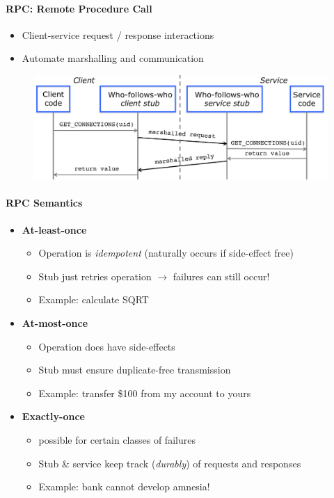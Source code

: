 \paragraph{RPC: Remote Procedure Call}
\begin{itemize}
\item Client-service request / response interactions
\item Automate marshalling and communication
\end{itemize}

\begin{figure}[h]
\begin{minipage}{1.0\linewidth}
  \begin{center}
    \includegraphics[scale=0.8]{graphics/rpc}
  \end{center}
  \end{minipage}
\end{figure}

\paragraph{RPC Semantics}
\begin{itemize}
\item \textbf{At-least-once}
  \begin{itemize}
  \item Operation is \textit{idempotent}
    (naturally occurs if side-effect free)
  \item Stub just retries operation $\rightarrow$ failures
    can still occur!
  \item Example: calculate SQRT
  \end{itemize}

\item \textbf{At-most-once}
  \begin{itemize}
  \item Operation does have side-effects
  \item Stub must ensure duplicate-free transmission
  \item Example: transfer \$100 from my account to yours
  \end{itemize}

\item \textbf{Exactly-once}
  \begin{itemize}
  \item possible for certain classes of failures
  \item Stub \& service keep track (\textit{durably}) of requests and
    responses
  \item Example: bank cannot develop amnesia!
  \end{itemize}
\end{itemize}

